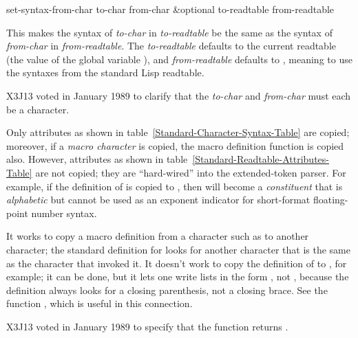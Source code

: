 \begin{defun}[Function]
set-syntax-from-char to-char from-char &optional to-readtable from-readtable

This makes the syntax of \emph{to-char} in \emph{to-readtable} be the same as the
syntax of \emph{from-char} in \emph{from-readtable}.  The \emph{to-readtable}
defaults to the current readtable (the value of the global variable
), and \emph{from-readtable} defaults to {\false}, meaning
to use the syntaxes from the standard Lisp readtable.
\begin{new}
X3J13 voted in January 1989
to clarify that the \emph{to-char} and \emph{from-char}
must each be a character.
\end{new}

Only attributes as shown in
table~\ref{Standard-Character-Syntax-Table} are copied; moreover,
if a \emph{macro character} is copied, the macro definition function
is copied also.
However, attributes as shown
in table~\ref{Standard-Readtable-Attributes-Table} are not copied;
they are ``hard-wired'' into the extended-token parser.
For example, if the definition of  is copied to \cdf{*},
then \cdf{*} will become a \emph{constituent} that is
\emph{alphabetic} but cannot be used
as an exponent indicator for short-format floating-point number syntax.

It works to copy a macro definition from a character such as
 to another character; the standard definition for 
looks for another character that is the same as the character that
invoked it.  It doesn't work to copy the definition of \cd{(}
to \cd{{\Xlbrace}}, for example; it can be done, but it lets one write lists
in the form , not ,
because the definition
always looks for a closing parenthesis, not a closing brace.  See the function
, which is useful in this connection.

\begin{new}
X3J13 voted in January 1989
to specify that the  function returns .
\end{new}
\end{defun}

